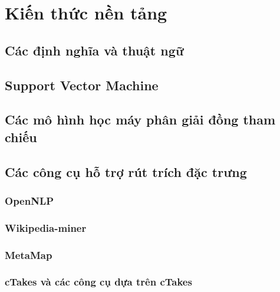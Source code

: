 \chapter{Kiến thức nền tảng}
\section{Các định nghĩa và thuật ngữ}
\section{Support Vector Machine}
\section{Các mô hình học máy phân giải đồng tham chiếu}
\section{Các công cụ hỗ trợ rút trích đặc trưng} \label{tools}

\subsection*{OpenNLP}

\subsection*{Wikipedia-miner}

\subsection*{MetaMap}

\subsection*{cTakes và các công cụ dựa trên cTakes}
